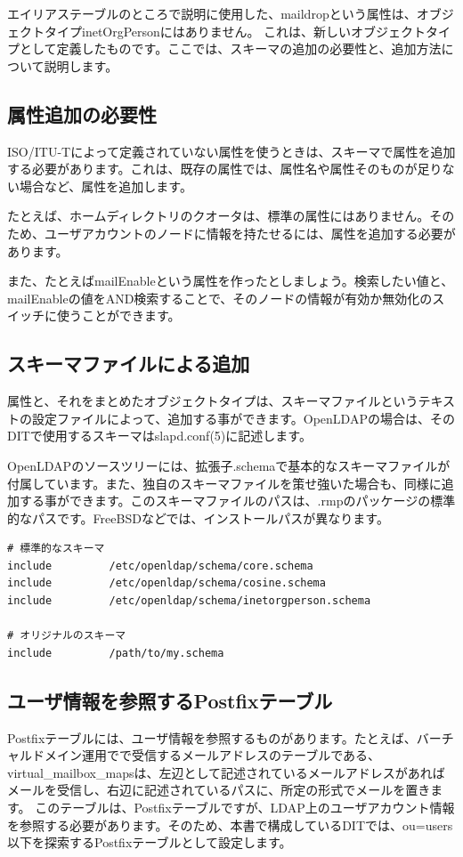エイリアステーブルのところで説明に使用した、maildropという属性は、オブジェクトタイプinetOrgPersonにはありません。
これは、新しいオブジェクトタイプとして定義したものです。ここでは、スキーマの追加の必要性と、追加方法について説明します。

\subsection{属性追加の必要性}

ISO/ITU-Tによって定義されていない属性を使うときは、スキーマで属性を追加する必要があります。これは、既存の属性では、属性名や属性そのものが足りない場合など、属性を追加します。

たとえば、ホームディレクトリのクオータは、標準の属性にはありません。そのため、ユーザアカウントのノードに情報を持たせるには、属性を追加する必要があります。

また、たとえばmailEnableという属性を作ったとしましょう。検索したい値と、mailEnableの値をAND検索することで、そのノードの情報が有効か無効化のスイッチに使うことができます。


\subsection{スキーマファイルによる追加}

属性と、それをまとめたオブジェクトタイプは、スキーマファイルというテキストの設定ファイルによって、追加する事ができます。OpenLDAPの場合は、そのDITで使用するスキーマはslapd.conf(5)に記述します。

OpenLDAPのソースツリーには、拡張子.schemaで基本的なスキーマファイルが付属しています。また、独自のスキーマファイルを策せ強いた場合も、同様に追加する事ができます。このスキーマファイルのパスは、.rmpのパッケージの標準的なパスです。FreeBSDなどでは、インストールパスが異なります。

\begin{verbatim}
# 標準的なスキーマ
include         /etc/openldap/schema/core.schema
include         /etc/openldap/schema/cosine.schema
include         /etc/openldap/schema/inetorgperson.schema

# オリジナルのスキーマ
include         /path/to/my.schema
\end{verbatim}

\subsection{ユーザ情報を参照するPostfixテーブル}
Postfixテーブルには、ユーザ情報を参照するものがあります。たとえば、バーチャルドメイン運用でで受信するメールアドレスのテーブルである、virtual\_mailbox\_mapsは、左辺として記述されているメールアドレスがあればメールを受信し、右辺に記述されているパスに、所定の形式でメールを置きます。
このテーブルは、Postfixテーブルですが、LDAP上のユーザアカウント情報を参照する必要があります。そのため、本書で構成しているDITでは、ou=users以下を探索するPostfixテーブルとして設定します。